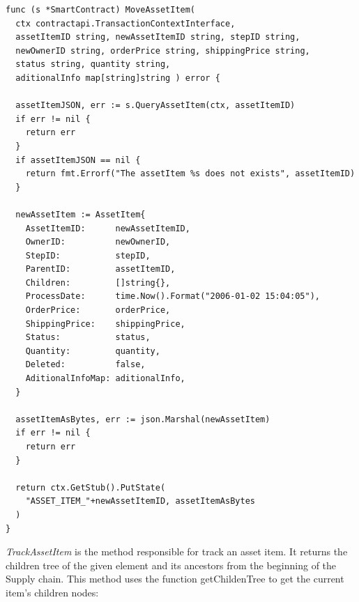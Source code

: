 \begin{verbatim}
func (s *SmartContract) MoveAssetItem(
  ctx contractapi.TransactionContextInterface, 
  assetItemID string, newAssetItemID string, stepID string, 
  newOwnerID string, orderPrice string, shippingPrice string, 
  status string, quantity string, 
  aditionalInfo map[string]string ) error {
  
  assetItemJSON, err := s.QueryAssetItem(ctx, assetItemID)
  if err != nil {
    return err
  }
  if assetItemJSON == nil {
    return fmt.Errorf("The assetItem %s does not exists", assetItemID)
  }

  newAssetItem := AssetItem{
    AssetItemID:      newAssetItemID,
    OwnerID:          newOwnerID,
    StepID:           stepID,
    ParentID:         assetItemID,
    Children:         []string{},
    ProcessDate:      time.Now().Format("2006-01-02 15:04:05"),
    OrderPrice:       orderPrice,
    ShippingPrice:    shippingPrice,
    Status:           status,
    Quantity:         quantity,
    Deleted:          false,
    AditionalInfoMap: aditionalInfo,
  }

  assetItemAsBytes, err := json.Marshal(newAssetItem)
  if err != nil {
    return err
  }

  return ctx.GetStub().PutState(
    "ASSET_ITEM_"+newAssetItemID, assetItemAsBytes
  )
}
\end{verbatim}

\textit{TrackAssetItem} is the method responsible for track an asset item. It returns the children tree of the given element and its ancestors from the beginning of the Supply chain. This method uses the function getChildenTree to get the current item's children nodes: 

